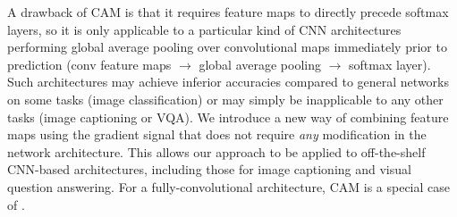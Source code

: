 A drawback of CAM is that it requires feature maps to directly precede softmax layers, so it is only applicable to a particular kind of CNN architectures performing global average pooling over convolutional maps immediately prior to prediction (\ie conv feature maps $\rightarrow$ global average pooling $\rightarrow$ softmax layer).
Such architectures may achieve inferior accuracies compared to general networks on some tasks (\eg image classification) or may simply be inapplicable to any other tasks (\eg image captioning or VQA).
We introduce a new way of combining feature maps using the gradient signal that does not require \emph{any} modification in the network architecture.
This allows our approach to be applied to off-the-shelf CNN-based architectures,
including those for image captioning and visual question answering.
For a fully-convolutional architecture, CAM is a special case of \gcam{}.



